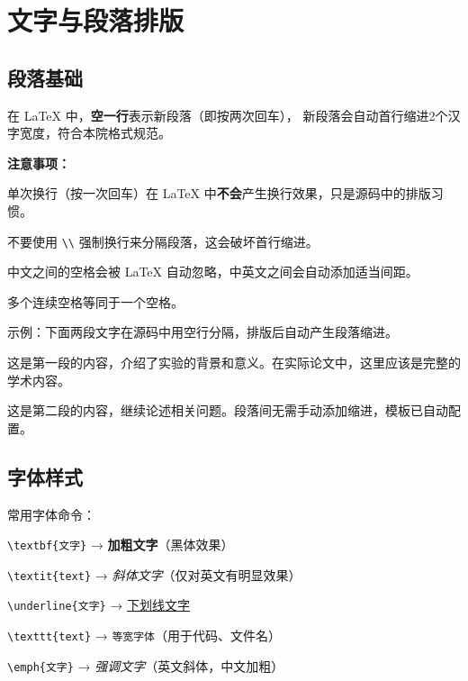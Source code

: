 

\chapter{文字与段落排版}\label{chap:typesetting}

\section{段落基础}

在 \LaTeX{} 中，\textbf{空一行}表示新段落（即按两次回车），
新段落会自动首行缩进2个汉字宽度，符合本院格式规范。

\textbf{注意事项：}

\begin{compactitem}
    \item 单次换行（按一次回车）在 \LaTeX{} 中\textbf{不会}产生换行效果，只是源码中的排版习惯。
    \item 不要使用 \verb|\\| 强制换行来分隔段落，这会破坏首行缩进。
    \item 中文之间的空格会被 \LaTeX{} 自动忽略，中英文之间会自动添加适当间距。
    \item 多个连续空格等同于一个空格。
\end{compactitem}

示例：下面两段文字在源码中用空行分隔，排版后自动产生段落缩进。

这是第一段的内容，介绍了实验的背景和意义。在实际论文中，这里应该是完整的学术内容。

这是第二段的内容，继续论述相关问题。段落间无需手动添加缩进，模板已自动配置。

\section{字体样式}

常用字体命令：

\begin{compactitem}
    \item \verb|\textbf{文字}| → \textbf{加粗文字}（黑体效果）
    \item \verb|\textit{text}| → \textit{斜体文字}（仅对英文有明显效果）
    \item \verb|\underline{文字}| → \underline{下划线文字}
    \item \verb|\texttt{text}| → \texttt{等宽字体}（用于代码、文件名）
    \item \verb|\emph{文字}| → \emph{强调文字}（英文斜体，中文加粗）
\end{compactitem}

